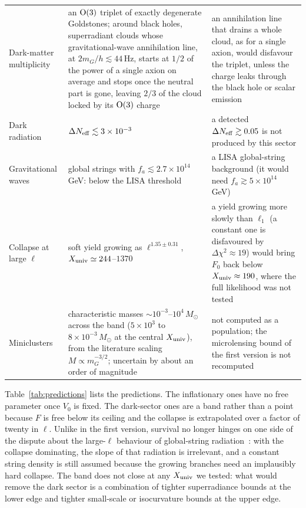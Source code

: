 \documentclass[11pt,a4paper]{article}
\newcommand{\Xu}{X_{\rm univ}}
\begin{document}
\begin{table}[t]
\begin{tabular}{L{3.0cm}L{5.4cm}L{5.6cm}}
Dark-matter multiplicity & an ${\rm O}(3)$ triplet of exactly degenerate Goldstones; around black holes, superradiant clouds whose gravitational-wave annihilation line, at $2m_G/h\lesssim44$\,Hz, starts at $1/2$ of the power of a single axion on average and stops once the neutral part is gone, leaving $2/3$ of the cloud locked by its ${\rm O}(3)$ charge & an annihilation line that drains a whole cloud, as for a single axion, would disfavour the triplet, unless the charge leaks through the black hole or scalar emission\\
Dark radiation & $\Delta N_{\rm eff}\lesssim3\times10^{-3}$ & a detected $\Delta N_{\rm eff}\gtrsim0.05$ is not produced by this sector\\
Gravitational waves & global strings with $f_a\lesssim2.7\times10^{14}$\,GeV: below the LISA threshold~\cite{GHN2021} & a LISA global-string background (it would need $f_a\gtrsim5\times10^{14}$\,GeV)\\
Collapse at large $\ell$ & soft yield growing as $\ell^{1.35\pm0.31}$, $\Xu\simeq244$--$1370$ & a yield growing more slowly than $\ell_1$ (a constant one is disfavoured by $\Delta\chi^2\approx19$) would bring $F_0$ back below $\Xu\approx190$, where the full likelihood was not tested\\
Miniclusters & characteristic masses $\sim10^{-3}$--$10^{4}\,M_\odot$ across the band ($5\times10^3$ to $8\times10^{-3}\,M_\odot$ at the central $\Xu$), from the literature scaling $M\propto m_G^{-3/2}$; uncertain by about an order of magnitude & not computed as a population; the microlensing bound of the first version is not recomputed\\
\bottomrule
\end{tabular}
\end{table}

Table~\ref{tab:predictions} lists the predictions.
The inflationary ones have no free parameter once $V_0$ is fixed.
The dark-sector ones are a band rather than a point because $F$ is free below its ceiling and the collapse is extrapolated over a factor of twenty in $\ell$.
Unlike in the first version, survival no longer hinges on one side of the dispute about the large-$\ell$ behaviour of global-string radiation~\cite{GHV2021,Buschmann2022,KimParkSon2024,Saikawa2024,Benabou2025,Correia2025spectrum}: with the collapse dominating, the slope of that radiation is irrelevant, and a constant string density is still assumed because the growing branches need an implausibly hard collapse.
The band does not close at any $\Xu$ we tested: what would remove the dark sector is a combination of tighter superradiance bounds at the lower edge and tighter small-scale or isocurvature bounds at the upper edge.
\end{document}
